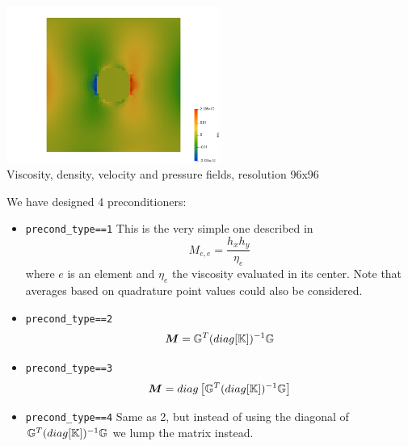 \begin{center}
\includegraphics[width=7cm]{python_codes/fieldstone_16/results/exy}\\
{\captionfont Viscosity, density, velocity and pressure fields, resolution 96x96}
\end{center} 

We have designed 4 preconditioners:
\begin{itemize}
\item {\tt precond\_type==1} This is the very simple one described in 
\[
M_{e,e} = \frac{h_x h_y}{\eta_e} 
\]
where $e$ is an element and $\eta_e$ the viscosity evaluated in its center. Note that 
averages based on quadrature point values could also be considered.
\item {\tt precond\_type==2}
\[
{\bm M} = {\mathbb{G}}^T (diag [{\mathbb{K}}]  )^{-1} {\mathbb{G}} 
\]
\item {\tt precond\_type==3} 
\[
{\bm M} = diag \left[ {\mathbb{G}}^T (diag [{\mathbb{K}}]  )^{-1} {\mathbb{G}} \right]
\]
\item {\tt precond\_type==4} Same as 2, but instead of using the 
diagonal of $ {\mathbb{G}}^T (diag [{\mathbb{K}}]  )^{-1} {\mathbb{G}}$ we lump the matrix instead.

\end{itemize}


